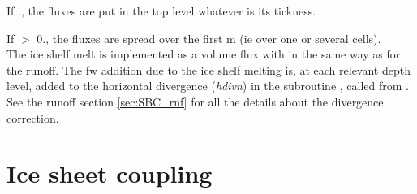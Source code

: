 \documentclass[../tex_main/NEMO_manual]{subfiles}
\begin{document}
If ., the fluxes are put in the top level whatever is its tickness. 

If  $>$ 0., the fluxes are spread over the first  m (ie over one or several cells).\\

The ice shelf melt is implemented as a volume flux with in the same way as for the runoff.
The fw addition due to the ice shelf melting is, at each relevant depth level, added to the horizontal divergence 
(\textit{hdivn}) in the subroutine , called from . 
See the runoff section \autoref{sec:SBC_rnf} for all the details about the divergence correction. 


\section{Ice sheet coupling}
\label{sec:SBC_iscpl}
\end{document}
